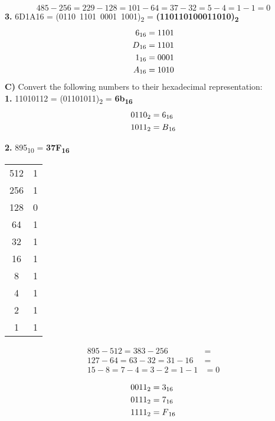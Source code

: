 \documentclass[12pt, letterpaper, twoside]{article}
\begin{document}
\[485-256=229-128=101-64=37-32=5-4=1-1=0\]
\break
\noindent \textbf{3.} 6D1A16 = (0110\ 1101\ 0001\ 1001)\textsubscript{2} = \textbf{(110110100011010)\textsubscript{2}}
\begin{align*}
    6\textsubscript{16}&=1101    \\
    D\textsubscript{16}&=1101    \\
    1\textsubscript{16}&=0001    \\
    A\textsubscript{16}&=1010\\
\end{align*}
\newpage
\noindent \textbf{C)} Convert the following numbers to their hexadecimal representation:\\
\break
\noindent \textbf{1.} 11010112 = (01101011)\textsubscript{2} = \textbf{6b\textsubscript{16}}
\begin{align*}
 0110 \textsubscript{2}&=6\textsubscript{16}     \\
 1011\textsubscript{2} &=B\textsubscript{16}    \\
\end{align*}


\noindent \textbf{2.} 895\textsubscript{10} = \textbf{37F\textsubscript{16}}
\begin{center}
\begin{tabular}{c|c}
512 & 1\\
256 & 1\\
128 & 0\\
64 & 1\\
32 & 1\\
16 & 1\\ 
8 & 1\\
4 & 1\\
2 & 1\\
1 & 1\\
\end{tabular}
\end{center}
\begin{align*}
895-512=383-256 &= \\
127-64=63-32=31-16 &=\\
15-8=7-4=3-2=1-1 &=0\\
\end{align*}
\begin{align*}
0011\textsubscript{2} &= 3\textsubscript{16}\\
0111\textsubscript{2} &= 7\textsubscript{16}\\ 
1111\textsubscript{2} &= F\textsubscript{16}\\
\end{align*}
\end{document}
